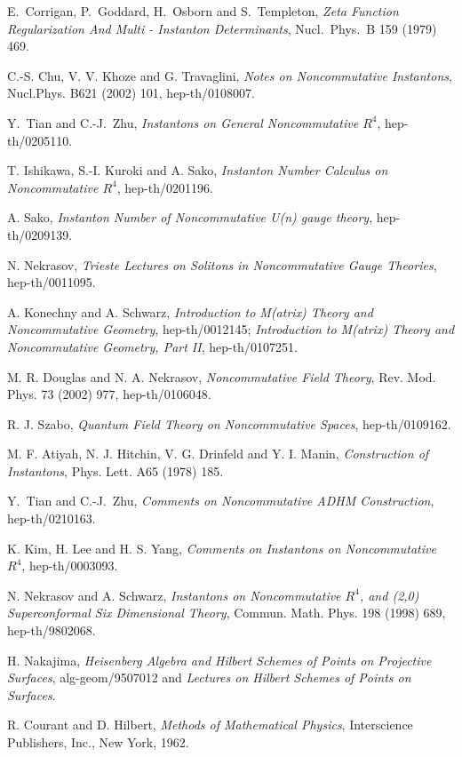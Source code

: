 \documentclass[a4paper,a4paper]{article}
\begin{document}
\begin{thebibliography}{99}

 E.~Corrigan, P.~Goddard, H.~Osborn and S.~Templeton,
\textit{Zeta Function Regularization And Multi - Instanton
Determinants}, Nucl.\ Phys.\ B 159 (1979) 469.

 C.-S. Chu, V. V. Khoze and G. Travaglini, \textit{Notes on
Noncommutative Instantons}, Nucl.Phys. B621 (2002) 101, hep-th/0108007.

 Y.~Tian and C.-J.~Zhu, \textit{Instantons on General
Noncommutative $R^{4}$}, hep-th/0205110.

 T. Ishikawa, S.-I. Kuroki and A. Sako, \textit{Instanton
Number Calculus on Noncommutative $R^{4}$}, hep-th/0201196.

 A. Sako, \textit{Instanton Number of Noncommutative U(n) gauge
theory}, hep-th/0209139.

 N. Nekrasov, \textit{Trieste Lectures on Solitons in
Noncommutative Gauge Theories}, hep-th/0011095.

 A. Konechny and A. Schwarz, \textit{Introduction to
M(atrix) Theory and Noncommutative Geometry}, hep-th/0012145; \textit{%
Introduction to M(atrix) Theory and Noncommutative Geometry, Part II},
hep-th/0107251.

 M. R. Douglas and N. A. Nekrasov, \textit{Noncommutative
Field Theory}, Rev. Mod. Phys. 73 (2002) 977, hep-th/0106048.

 R. J. Szabo, \textit{Quantum Field Theory on
Noncommutative Spaces}, hep-th/0109162.

 M. F. Atiyah, N. J. Hitchin, V. G. Drinfeld and Y. I. Manin,
\textit{Construction of Instantons}, Phys. Lett. A65 (1978) 185.

 Y.~Tian and C.-J.~Zhu, \textit{Comments on Noncommutative ADHM Construction}, hep-th/0210163.

 K. Kim, H. Lee and H. S. Yang, {\it Comments on
Instantons on Noncommutative $R^4$}, hep-th/0003093.

 N. Nekrasov and A. Schwarz, \textit{Instantons on
Noncommutative $R^{4}$, and (2,0) Superconformal Six Dimensional Theory},
Commun. Math. Phys. 198 (1998) 689, hep-th/9802068.

 H. Nakajima, \textit{Heisenberg Algebra and Hilbert
Schemes of Points on Projective Surfaces}, alg-geom/9507012 and \textit{%
Lectures on Hilbert Schemes of Points on Surfaces}.

 R. Courant and D. Hilbert, \textit{Methods of
Mathematical Physics}, Interscience Publishers, Inc., New York,
1962.

\end{thebibliography}
\end{document}
